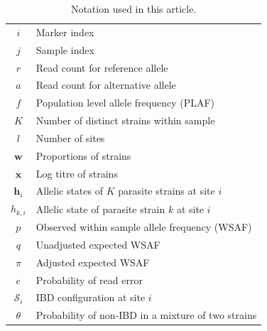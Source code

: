 \documentclass[9pt,lineno]{elife}
\begin{document}
\begin{table}[htb]
\centering
\begin{tabular}{c|l}\hline
$i$              & Marker index\\
$j$              & Sample index \\
$r$              & Read count for reference allele \\
$a$              & Read count for alternative allele \\
$f$              & Population level allele frequency (PLAF) \\
$K$              & Number of distinct strains within sample \\
$l$              & Number of sites\\
$\mathbf{w}$      & Proportions of strains \\
$\mathbf{x}$	& Log titre of strains \\
$\mathbf{h}_{i}$ & Allelic states of $K$ parasite strains at site $i$ \\
$h_{k,i}$   & Allelic state of parasite strain $k$ at site $i$\\
$p$              & Observed within sample allele frequency (WSAF) \\
$q$              & Unadjusted expected WSAF  \\
$\pi$            & Adjusted expected WSAF \\
$e$              & Probability of read error\\
$\mathcal{S}_{i}$ & IBD configuration at site $i$ \\
$\theta$ & Probability of non-IBD in a mixture of two strains \\
\hline
\end{tabular}
\vspace{.2cm}
\caption{Notation used in this article.}\label{tab:notation}
\end{table}
\end{document}
